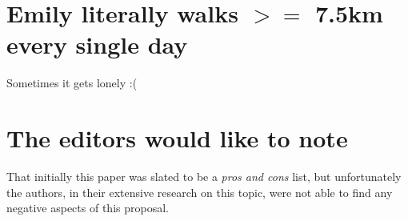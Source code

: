\documentclass[12pt]{article}
\begin{document}
\begin{FlushLeft}
\section{Emily literally walks $>=$ 7.5km every single day}
Sometimes it gets lonely :(

\section*{The editors would like to note}
That initially this paper was slated to be a \textit{pros and cons} list, but unfortunately the authors, in their extensive research on this topic, were not able to find any negative aspects of this proposal.\\ 



\end{FlushLeft}

\clearpage
\end{document}
